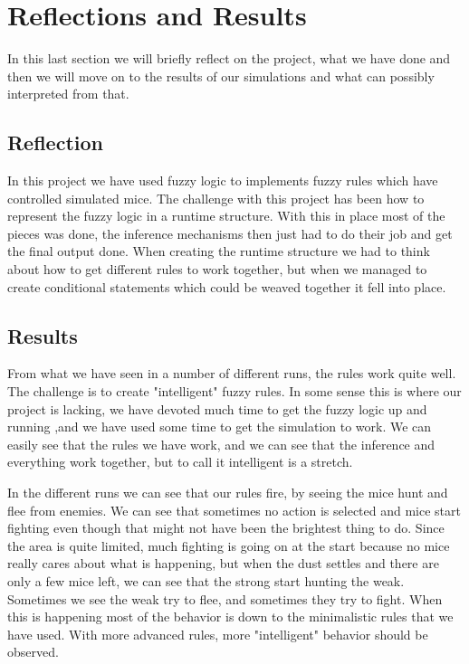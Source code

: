 \section{Reflections and Results}\label{reflections and results}
In this last section we will briefly reflect on the project, what we have
done and then we will move on to the results of our simulations and what can
possibly interpreted from that.

\subsection{Reflection}\label{reflection}
In this project we have used fuzzy logic to implements fuzzy rules which have
controlled simulated mice. The challenge with this project has been how to
represent the fuzzy logic in a runtime structure. With this in place most of
the pieces was done, the inference mechanisms then just had to do their job
and get the final output done. When creating the runtime structure we had to
think about how to get different rules to work together, but when we managed
to create conditional statements which could be weaved together it fell into
place.

\subsection{Results}\label{results}
From what we have seen in a number of different runs, the rules work
quite well. The challenge is to create "intelligent" fuzzy rules. In some
sense this is where our project is lacking, we have devoted much time to
get the fuzzy logic up and running ,and we have used some time to get the
simulation to work. We can easily see that the rules we have work, and we
can see that the inference and everything work together, but to call
it intelligent is a stretch.

In the different runs we can see that our rules fire, by seeing the mice
hunt and flee from enemies. We can see that sometimes no action is selected
and mice start fighting even though that might not have been the brightest thing
to do. Since the area is quite limited, much fighting is going on at the start
because no mice really cares about what is happening, but when the dust settles
and there are only a few mice left, we can see that the strong start hunting
the weak. Sometimes we see the weak try to flee, and sometimes they try to
fight. When this is happening most of the behavior is down to the minimalistic
rules that we have used. With more advanced rules, more "intelligent" behavior
should be observed.

